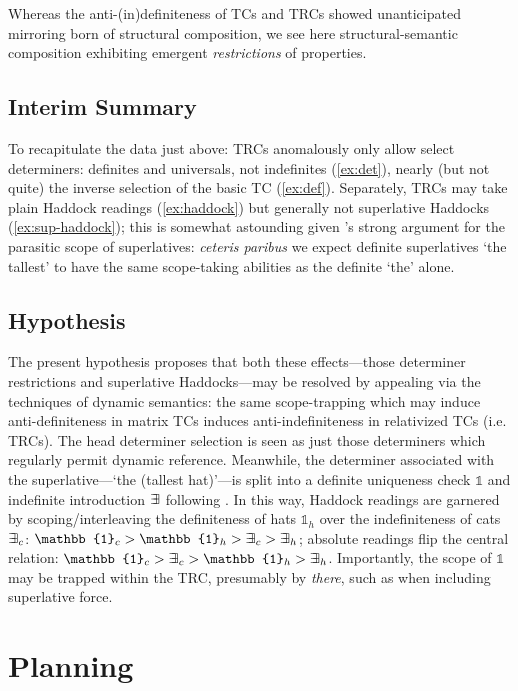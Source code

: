 \documentclass[11pt]{article}
\DeclareMathOperator{\bbexists}{\exists\mskip-7mu\exists}
\begin{document}
Whereas the anti-(in)definiteness of TCs and TRCs showed unanticipated mirroring born of structural composition, we see here structural-semantic composition exhibiting emergent \textit{restrictions} of properties.

\subsection{Interim Summary}

To recapitulate the data just above: TRCs anomalously only allow select determiners: definites and universals, not indefinites (\ref{ex:det}), nearly (but not quite) the inverse selection of the basic TC (\ref{ex:def}). Separately, TRCs may take plain Haddock readings (\ref{ex:haddock}) but generally not superlative Haddocks (\ref{ex:sup-haddock}); this is somewhat astounding given \citet{bumfordSplitscopeEffectsDefinite2017}'s strong argument for the parasitic scope of superlatives: \textit{ceteris paribus} we expect definite superlatives `the tallest' to have the same scope-taking abilities as the definite `the' alone.

\subsection{Hypothesis}
The present hypothesis proposes that both these effects---those determiner restrictions and superlative Haddocks---may be resolved by appealing via the techniques of dynamic semantics: the same scope-trapping which may induce anti-definiteness in matrix TCs induces anti-indefiniteness in relativized TCs (i.e. TRCs). The head determiner selection is seen as just those determiners which regularly permit dynamic reference. Meanwhile, the determiner associated with the superlative---`the (tallest hat)'---is split into a definite uniqueness check \(\mathbb{1}\) and indefinite introduction \(\bbexists\) following \citet{bumfordSplitscopeEffectsDefinite2017}. In this way, Haddock readings are garnered by scoping/interleaving the definiteness of hats \(\mathbb{1}_h\) over the indefiniteness of cats \(\bbexists_c\): \(\mathbb{1}_c > \mathbb{1}_h > \bbexists_c > \bbexists_h\); absolute readings flip the central relation: \(\mathbb{1}_c > \bbexists_c > \mathbb{1}_h > \bbexists_h\). Importantly, the scope of \(\mathbb{1}\) may be trapped within the TRC, presumably by \textit{there}, such as when including superlative force.

\section{Planning}
\end{document}
